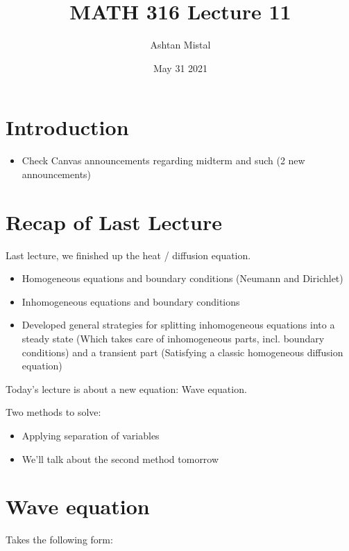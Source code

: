 \documentclass{article}
\title{MATH 316 Lecture 11}
\author{Ashtan Mistal}
\date{May 31 2021}
\begin{document}
\ifstandalone
\maketitle
\fi

\graphicspath{{./Lecture11/}}

\section{Introduction}

\begin{itemize}
    \item Check Canvas announcements regarding midterm and such (2 new announcements)
\end{itemize}

\section{Recap of Last Lecture}

Last lecture, we finished up the heat / diffusion equation. 

\begin{itemize}
    \item Homogeneous equations and boundary conditions (Neumann and Dirichlet)
    \item Inhomogeneous equations and boundary conditions
    \item Developed general strategies for splitting inhomogeneous equations into a steady state (Which takes care of inhomogeneous parts, incl. boundary conditions) and a transient part (Satisfying a classic homogeneous diffusion equation)
\end{itemize}

\hfill

Today's lecture is about a new equation: Wave equation. 

Two methods to solve:

\begin{itemize}
    \item Applying separation of variables
    \item We'll talk about the second method tomorrow
\end{itemize}

\section{Wave equation}

Takes the following form:
\end{document}
